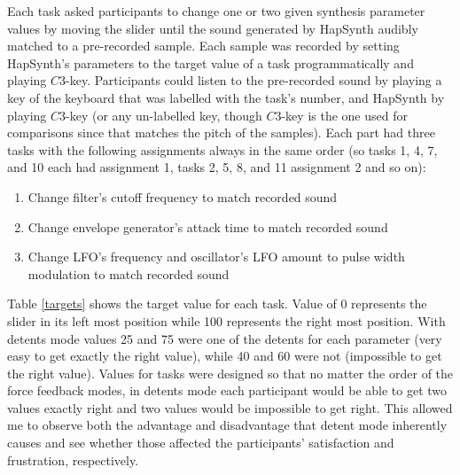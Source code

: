 Each task asked participants to change one or two given synthesis parameter values by moving the slider until the sound generated by HapSynth audibly matched to a pre-recorded sample. Each sample was recorded by setting HapSynth's parameters to the target value of a task programmatically and playing $C3$-key. Participants could listen to the pre-recorded sound by playing a key of the keyboard that was labelled with the task's number, and HapSynth by playing $C3$-key (or any un-labelled key, though $C3$-key is the one used for comparisons since that matches the pitch of the samples). Each part had three tasks with the following assignments always in the same order (so tasks 1, 4, 7, and 10 each had assignment 1, tasks 2, 5, 8, and 11 assignment 2 and so on):

\begin{enumerate}
	\item Change filter's cutoff frequency to match recorded sound
	\item Change envelope generator's attack time to match recorded sound
	\item Change LFO's frequency and oscillator's LFO amount to pulse width modulation to match recorded sound
\end{enumerate}

Table \ref{targets} shows the target value for each task. Value of 0 represents the slider in its left most position while 100 represents the right most position. With detents mode values 25 and 75 were one of the detents for each parameter (very easy to get exactly the right value), while 40 and 60 were not (impossible to get the right value). Values for tasks were designed so that no matter the order of the force feedback modes, in detents mode each participant would be able to get two values exactly right and two values would be impossible to get right. This allowed me to observe both the advantage and disadvantage that detent mode inherently causes and see whether those affected the participants' satisfaction and frustration, respectively.

